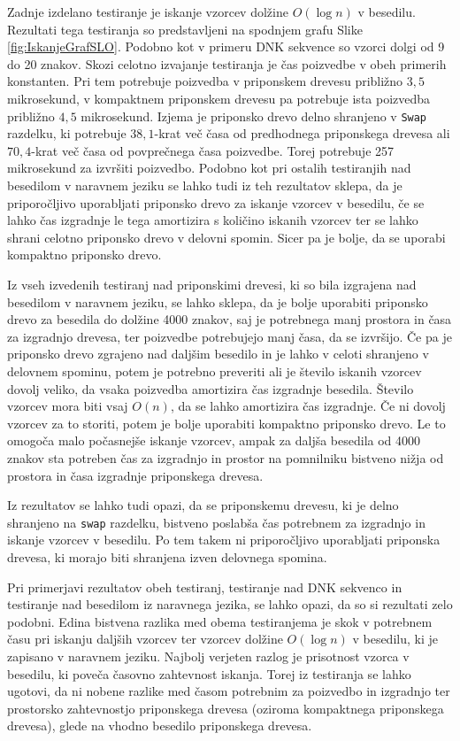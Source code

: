 Zadnje izdelano testiranje je iskanje vzorcev dolžine $O(\log{n})$ v besedilu. Rezultati tega testiranja so predstavljeni na spodnjem grafu Slike \ref{fig:IskanjeGrafSLO}. Podobno kot v primeru DNK sekvence so vzorci dolgi od 9 do 20 znakov. Skozi celotno izvajanje testiranja je čas poizvedbe v obeh primerih konstanten. Pri tem potrebuje poizvedba v priponskem drevesu približno $3,5$ mikrosekund, v kompaktnem priponskem drevesu pa potrebuje ista poizvedba približno $4,5$ mikrosekund. Izjema je priponsko drevo delno shranjeno v \verb|Swap| razdelku, ki potrebuje $38,1$-krat več časa od predhodnega priponskega drevesa ali $70,4$-krat več časa od povprečnega časa poizvedbe. Torej potrebuje 257 mikrosekund za izvršiti poizvedbo. Podobno kot pri ostalih testiranjih nad besedilom v naravnem jeziku se lahko tudi iz teh rezultatov sklepa, da je priporočljivo uporabljati priponsko drevo za iskanje vzorcev v besedilu, če se lahko čas izgradnje le tega amortizira s količino iskanih vzorcev ter se lahko shrani celotno priponsko drevo v delovni spomin. Sicer pa je bolje, da se uporabi kompaktno priponsko drevo.

Iz vseh izvedenih testiranj nad priponskimi drevesi, ki so bila izgrajena nad besedilom v naravnem jeziku, se lahko sklepa, da je bolje uporabiti priponsko drevo za besedila do dolžine 4000 znakov, saj je potrebnega manj prostora in časa za izgradnjo drevesa, ter poizvedbe potrebujejo manj časa, da se izvršijo. Če pa je priponsko drevo zgrajeno nad daljšim besedilo in je lahko v celoti shranjeno v delovnem spominu, potem je potrebno preveriti ali je število iskanih vzorcev dovolj veliko, da vsaka poizvedba amortizira čas izgradnje besedila. Število vzorcev mora biti vsaj $O(n)$, da se lahko amortizira čas izgradnje. Če ni dovolj vzorcev za to storiti, potem je bolje uporabiti kompaktno priponsko drevo. Le to omogoča malo počasnejše iskanje vzorcev, ampak za daljša besedila od 4000 znakov sta potreben čas za izgradnjo in prostor na pomnilniku bistveno nižja od prostora in časa izgradnje priponskega drevesa.

Iz rezultatov se lahko tudi opazi, da se priponskemu drevesu, ki je delno shranjeno na \verb|swap| razdelku, bistveno poslabša čas potrebnem za izgradnjo in iskanje vzorcev v besedilu. Po tem takem ni priporočljivo uporabljati priponska drevesa, ki morajo biti shranjena izven delovnega spomina.

Pri primerjavi rezultatov obeh testiranj, testiranje nad DNK sekvenco in testiranje nad besedilom iz naravnega jezika, se lahko opazi, da so si rezultati zelo podobni. Edina bistvena razlika med obema testiranjema je skok v potrebnem času pri iskanju daljših vzorcev ter vzorcev dolžine $O(\log{n})$ v besedilu, ki je zapisano v naravnem jeziku. Najbolj verjeten razlog je prisotnost vzorca v besedilu, ki poveča časovno zahtevnost iskanja. Torej iz testiranja se lahko ugotovi, da ni nobene razlike med časom potrebnim za poizvedbo in izgradnjo ter prostorsko zahtevnostjo priponskega drevesa (oziroma kompaktnega priponskega drevesa), glede na vhodno besedilo priponskega drevesa. 

